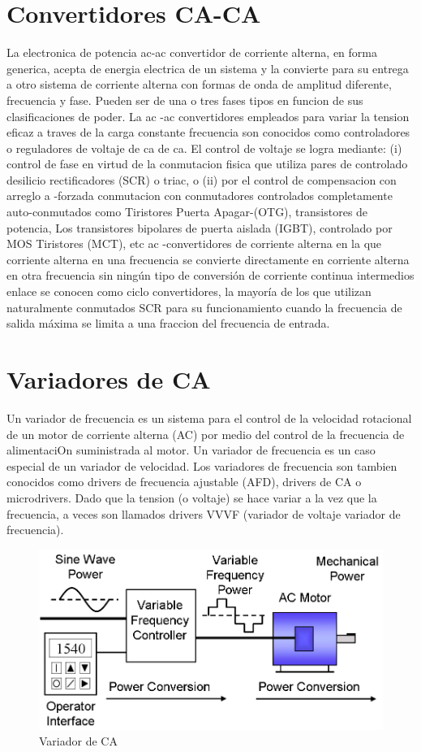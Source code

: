 \documentclass[11pt]{article}
\begin{document}
\section{Convertidores CA-CA}
La  electronica de potencia ac-ac convertidor de corriente alterna, en forma generica, acepta de energia electrica de un sistema y la convierte para su entrega a otro sistema de corriente alterna con formas de onda de amplitud diferente, frecuencia y fase. Pueden ser de una o tres fases tipos en funcion de sus clasificaciones de poder. La ac -ac convertidores empleados para variar la tension eficaz a traves de la carga constante frecuencia son conocidos como  controladores  o  reguladores  de  voltaje  de  ca de ca.  El  control  de  voltaje  se  logra  mediante:  (i)  control  de fase en virtud de la conmutacion fisica que utiliza pares de controlado desilicio rectificadores (SCR) o triac, o (ii) por   el   control de   compensacion   con   arreglo   a -forzada   conmutacion   con   conmutadores   controlados completamente auto-conmutados como Tiristores Puerta Apagar-(OTG), transistores de potencia, Los transistores bipolares  de  puerta  aislada  (IGBT),  controlado  por  MOS  Tiristores  (MCT),  etc   ac -convertidores  de  corriente alterna  en  la  que  corriente  alterna  en  una  frecuencia  se  convierte  directamente  en  corriente  alterna  en  otra frecuencia  sin  ningún  tipo  de  conversión de  corriente  continua  intermedios  enlace  se  conocen  como  ciclo convertidores,  la  mayoría  de  los  que  utilizan  naturalmente  conmutados  SCR  para  su  funcionamiento  cuando  la frecuencia de salida máxima se limita a una fraccion del frecuencia de entrada.
\section{Variadores de CA}
Un variador de frecuencia es un sistema para el control de la velocidad rotacional de un motor de corriente alterna (AC) por medio del control de la frecuencia de alimentaciOn suministrada al motor. Un variador de frecuencia es un caso especial de un variador de velocidad. Los variadores de frecuencia son tambien conocidos como drivers de frecuencia ajustable (AFD), drivers de CA o microdrivers. Dado que la tension (o voltaje) se hace variar a la vez que la frecuencia, a veces son llamados drivers VVVF (variador de voltaje variador de frecuencia).
\begin{figure}[htp]
\centering
\includegraphics[scale=0.30]{Variadores de CA.png}
\caption{Variador de CA}
\label{}
\end{figure}
\end{document}
